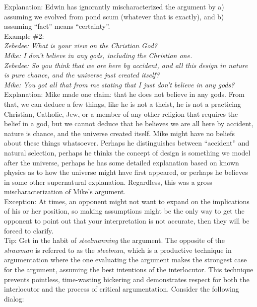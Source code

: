 \documentclass[a4paper,12pt,single,pdftex]{scrbook}
\begin{document}
    
      Explanation: Edwin has ignorantly mischaracterized the argument by a) assuming we evolved from pond scum (whatever that is exactly), and b) assuming “fact” means “certainty”.
    \\

    
      Example \#2:
    \\

    
      {\em Zebedee: What is your view on the Christian God?}
    \\

    
      {\em Mike: I don’t believe in any gods, including the Christian one.}
    \\

    
      {\em Zebedee: So you think that we are here by accident, and all this design in nature is pure chance, and the universe just created itself?}
    \\

    
      {\em Mike: You got all that from me stating that I just don’t believe in any gods?}
    \\

    
      Explanation: Mike made one claim: that he does not believe in any gods.  From that, we can deduce a few things, like he is not a theist, he is not a practicing Christian, Catholic, Jew, or a member of any other religion that requires the belief in a god, but we cannot deduce that he believes we are all here by accident, nature is chance, and the universe created itself.  Mike might have no beliefs about these things whatsoever.  Perhaps he distinguishes between “accident” and natural selection, perhaps he thinks the concept of design is something we model after the universe, perhaps he has some detailed explanation based on known physics as to how the universe might have first appeared, or perhaps he believes in some other supernatural explanation.  Regardless, this was a gross mischaracterization of Mike’s argument.
    \\

    
      Exception: At times, an opponent might not want to expand on the implications of his or her position, so making assumptions might be the only way to get the opponent to point out that your interpretation is not accurate, then they will be forced to clarify.
    \\

    
      Tip: Get in the habit of {\em steelmanning} the argument. The opposite of the {\em strawman} is referred to as the {\em steelman}, which is a productive technique in argumentation where the one evaluating the argument makes the strongest case for the argument, assuming the best intentions of the interlocutor. This technique prevents pointless, time-wasting bickering and demonstrates respect for both the interlocutor and the process of critical argumentation. Consider the following dialog:
    \\
\end{document}
